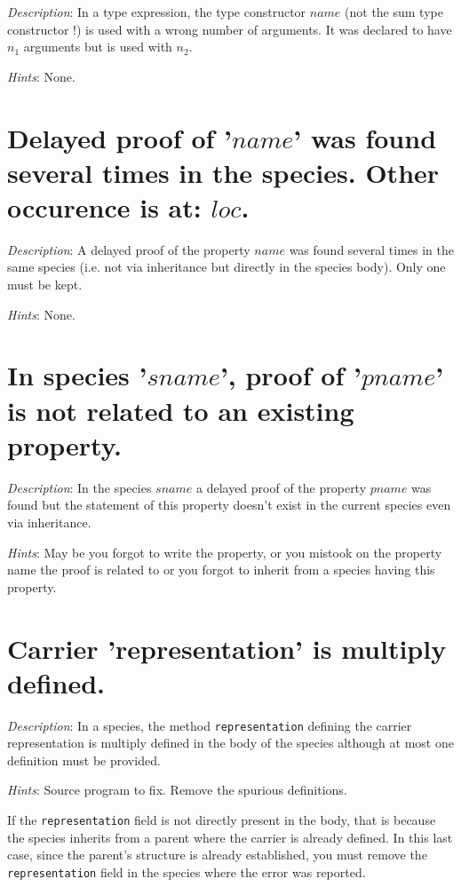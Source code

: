 {\em Description}: In a type expression, the type constructor $name$
(not the sum type constructor !) is used with a wrong number of
arguments. It was declared to have $n_1$ arguments but is used with
$n_2$.

{\em Hints}: None.



\section*{Delayed proof of '$name$' was found several times in the
  species. Other occurence is at: $loc$.}

{\em Description}: A delayed proof of the property $name$ was found
several times in the same species (i.e. not via inheritance but
directly in the species body). Only one must be kept.


{\em Hints}: None.



\section*{In species '$sname$', proof of '$pname$' is not related to
  an existing property.}

{\em Description}: In the species $sname$ a delayed proof of the
property $pname$ was found but the statement of this property doesn't
exist in the current species even via inheritance.


{\em Hints}: May be you forgot to write the property, or you mistook
on the property name the proof is related to or you forgot to inherit
from a species having this property.



\section*{Carrier 'representation' is multiply defined.}

{\em Description}: In a species, the method {\tt representation} defining the
carrier representation is multiply defined in the body of the species
although at most one definition must be provided.

{\em Hints}: Source program to fix. Remove the spurious definitions.

If the {\tt representation} field is not directly present in the
body, that is because the species inherits from a parent where the
carrier is already defined. In this last case, since the parent's
structure is already established, you must remove the {\tt representation} field
in the species where the error was reported.



